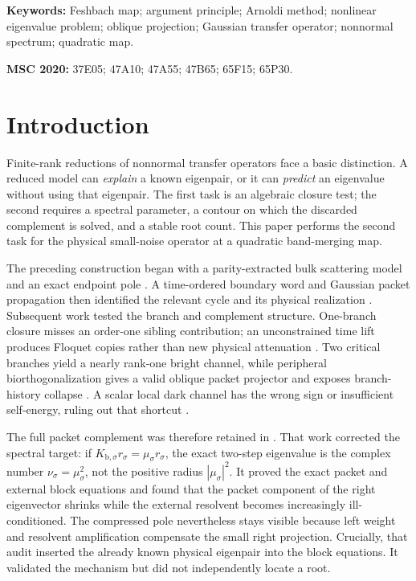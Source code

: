 \documentclass[11pt]{article}
\theoremstyle{definition}
\theoremstyle{remark}
\begin{document}
\noindent\textbf{Keywords:} Feshbach map; argument principle; Arnoldi
method; nonlinear eigenvalue problem; oblique projection; Gaussian transfer
operator; nonnormal spectrum; quadratic map.

\medskip
\noindent\textbf{MSC 2020:} 37E05; 47A10; 47A55; 47B65; 65F15; 65P30.

\section{Introduction}
\label{sec:introduction}

Finite-rank reductions of nonnormal transfer operators face a basic
distinction.  A reduced model can \emph{explain} a known eigenpair, or it can
\emph{predict} an eigenvalue without using that eigenpair.  The first task is
an algebraic closure test; the second requires a spectral parameter, a
contour on which the discarded complement is solved, and a stable root
count.  This paper performs the second task for the physical small-noise
operator at a quadratic band-merging map.

The preceding construction began with a parity-extracted bulk scattering
model and an exact endpoint pole \citep{WangBulkScattering2026}.  A
time-ordered boundary word and Gaussian packet propagation then identified
the relevant cycle and its physical realization
\citep{WangTimeOrdered2026,WangGaussianReturn2026}.  Subsequent work tested
the branch and complement structure.  One-branch closure misses an
order-one sibling contribution; an unconstrained time lift produces
Floquet copies rather than new physical attenuation
\citep{WangComplement2026}.  Two critical branches yield a nearly rank-one
bright channel, while peripheral biorthogonalization gives a valid oblique
packet projector and exposes branch-history collapse
\citep{WangSectorBranch2026,WangBiorthogonal2026}.  A scalar local dark
channel has the wrong sign or insufficient self-energy, ruling out that
shortcut \citep{WangDarkSchur2026}.

The full packet complement was therefore retained in
\citet{WangPhysicalFeshbach2026}.  That work corrected the spectral target:
if $K_{\mathrm b,\sigma}r_\sigma=\mu_\sigma r_\sigma$, the exact two-step
eigenvalue is the complex number $\nu_\sigma=\mu_\sigma^2$, not the positive
radius $|\mu_\sigma|^2$.  It proved the exact packet and external block
equations and found that the packet component of the right eigenvector
shrinks while the external resolvent becomes increasingly ill-conditioned.
The compressed pole nevertheless stays visible because left weight and
resolvent amplification compensate the small right projection.  Crucially,
that audit inserted the already known physical eigenpair into the block
equations.  It validated the mechanism but did not independently locate a
root.
\end{document}
